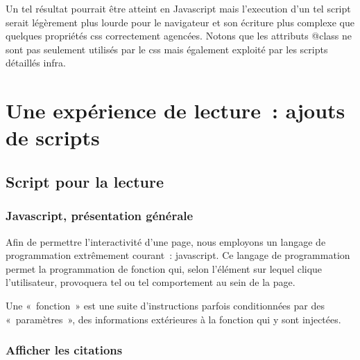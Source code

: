 \documentclass[12pt, a4paper]{article}
\begin{document}
Un tel résultat pourrait être atteint en Javascript mais l'execution d'un tel script serait légèrement plus lourde pour le navigateur et son écriture plus complexe que quelques propriétés css correctement agencées. Notons que les attributs @class ne sont pas seulement utilisés par le css mais également exploité par les scripts détaillés infra.









\section{Une expérience de lecture~: ajouts de scripts}
\label{js}
    \subsection{Script pour la lecture}

\subsubsection{Javascript, présentation générale}
Afin de permettre l'interactivité d'une page, nous employons un langage de programmation extrêmement courant~: javascript. Ce langage de programmation permet la programmation de fonction qui, selon l'élément sur lequel clique l'utilisateur, provoquera tel ou tel comportement au sein de la page.

Une «~fonction~» est une suite d'instructions parfois conditionnées par des «~paramètres~», des informations extérieures à la fonction qui y sont injectées.

\subsubsection{Afficher les citations}
\label{quote_dis}

\end{document}

